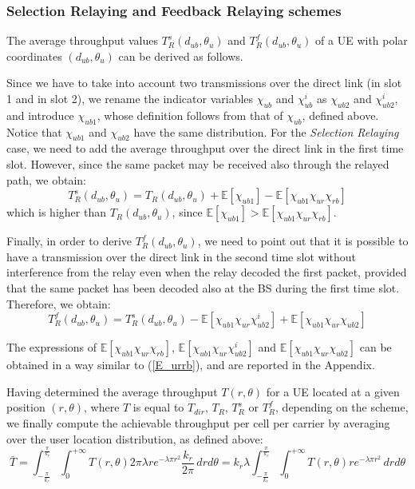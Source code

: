\documentclass[12pt, letterpaper, onecolumn, draftcls]{IEEEtran}
\begin{document}
\subsubsection{Selection Relaying and Feedback Relaying schemes}
The average throughput values $T_R^s(d_{ub},\theta_u)$ and $T_R^{f}(d_{ub},\theta_u)$ of a UE with polar coordinates $(d_{ub},\theta_u)$ can be derived as follows.

Since we have to take into account two transmissions over the direct link (in slot 1 and in slot 2), we rename the indicator variables $\chi_{ub}$ and $\chi_{ub}^i$ as $\chi_{ub2}$ and $\chi_{ub2}^i$, and introduce $\chi_{ub1}$, whose definition follows from that of $\chi_{ub}$, defined above. Notice that $\chi_{ub1}$ and $\chi_{ub2}$ have the same distribution. For the \textit{Selection Relaying} case, we need to add the average throughput over the direct link in the first time slot. However, since the same packet may be received also through the relayed path, we obtain:
\begin{equation}
 T_R^s(d_{ub},\theta_u) = T_R(d_{ub},\theta_u) + \mathbb{E}\left[\chi_{ub1}\right] - \mathbb{E}\left[\chi_{ub1}\chi_{ur}\chi_{rb}\right]
\end{equation}
which is higher than $T_R(d_{ub},\theta_u)$, since $\mathbb{E}\left[\chi_{ub1}\right] > \mathbb{E}\left[\chi_{ub1}\chi_{ur}\chi_{rb}\right]$.

Finally, in order to derive $T_R^f(d_{ub},\theta_u)$, we need to point out that it is possible to have a transmission over the direct link in the second time slot without interference from the relay even when the relay decoded the first packet, provided that the same packet has been decoded also at the BS during the first time slot. Therefore, we obtain:
\begin{equation}
 T_R^{f}(d_{ub},\theta_u) = T_R^s(d_{ub},\theta_u) - \mathbb{E}\left[\chi_{ub1}\chi_{ur}\chi_{ub2}^i\right] + \mathbb{E}\left[\chi_{ub1}\chi_{ur}\chi_{ub2}\right]
\end{equation}

The expressions of $\mathbb{E}\left[\chi_{ub1}\chi_{ur}\chi_{rb}\right]$, $\mathbb{E}\left[\chi_{ub1}\chi_{ur}\chi_{ub2}^i\right]$ and $\mathbb{E}\left[\chi_{ub1}\chi_{ur}\chi_{ub2}\right]$ can be obtained in a way similar to (\ref{E_urrb}), and are reported in the Appendix.



Having determined the average throughput $T(r,\theta)$ for a UE located at a given position $(r,\theta)$, where $T$ is equal to $T_{dir}$, $T_R$, $T_R^s$ or $T_R^f$, depending on the scheme, we finally compute the achievable throughput per cell per carrier by averaging over the user location distribution, as defined above:
\begin{equation}
 \bar{T} = \int_{-\frac{\pi}{k_r}}^{\frac{\pi}{k_r}}\int_{0}^{+\infty}T(r,\theta)2\pi\lambda re^{-\lambda\pi r^2}\frac{k_r}{2\pi}\,drd\theta = k_r\lambda\int_{-\frac{\pi}{k_r}}^{\frac{\pi}{k_r}}\int_{0}^{+\infty}T(r,\theta) re^{-\lambda\pi r^2}\,drd\theta
 \label{avethro}
\end{equation}
\end{document}
